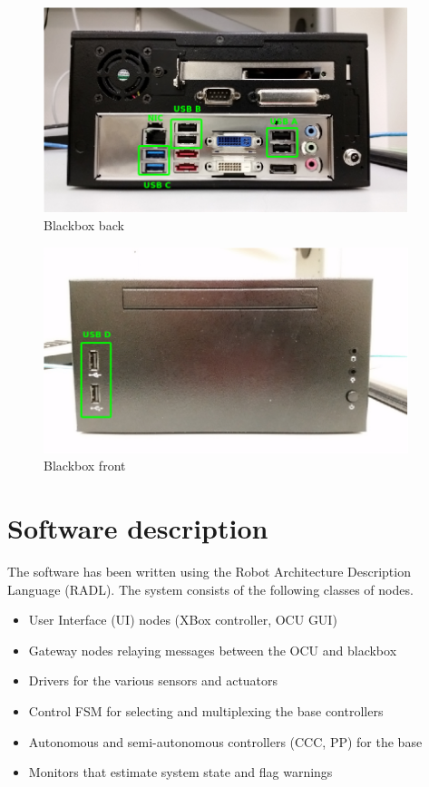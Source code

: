 \begin{figure}[htb]
\begin{center}
\includegraphics[height=60mm]{figures/blackbox_back.png}
\caption{Blackbox back}
\label{fig:blackbox_back}
\end{center}
\end{figure}

\begin{figure}[htb]
\begin{center}
\includegraphics[height=60mm]{figures/blackbox_front.png} 
\caption{Blackbox front}
\label{fig:blackbox_front}
\end{center}
\end{figure}



\chapter{Software description}
The software has been written using the Robot Architecture Description Language (RADL). The system
consists of the following classes of nodes. 
\begin{itemize}
  \item User Interface (UI) nodes (XBox controller, OCU GUI)
  \item Gateway nodes relaying messages between the OCU and blackbox 
  \item Drivers for the various sensors and actuators
  \item Control FSM for selecting and multiplexing the base controllers
  \item Autonomous and semi-autonomous controllers (CCC, PP) for the base
  \item Monitors that estimate system state and flag warnings
\end{itemize}

